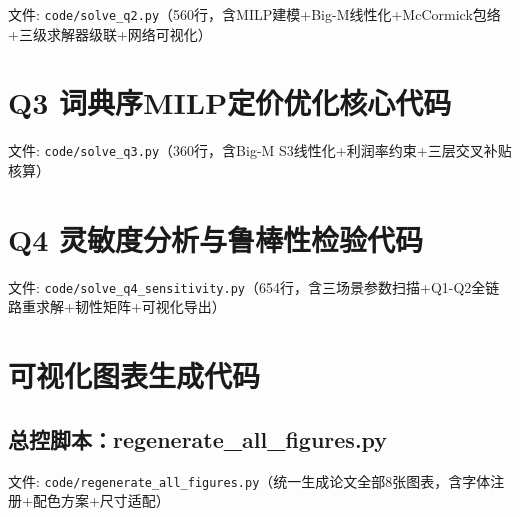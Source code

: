 {\small 文件: \texttt{code/solve\_q2.py}（560行，含MILP建模+Big-M线性化+McCormick包络+三级求解器级联+网络可视化）}



\section{Q3 词典序MILP定价优化核心代码}

{\small 文件: \texttt{code/solve\_q3.py}（360行，含Big-M S3线性化+利润率约束+三层交叉补贴核算）}



\section{Q4 灵敏度分析与鲁棒性检验代码}

{\small 文件: \texttt{code/solve\_q4\_sensitivity.py}（654行，含三场景参数扫描+Q1-Q2全链路重求解+韧性矩阵+可视化导出）}



\section{可视化图表生成代码}

\subsection*{总控脚本：regenerate\_all\_figures.py}

{\small 文件: \texttt{code/regenerate\_all\_figures.py}（统一生成论文全部8张图表，含字体注册+配色方案+尺寸适配）}



